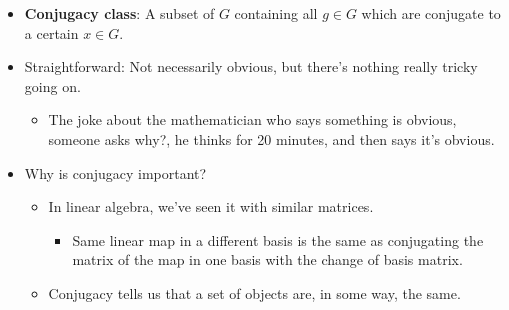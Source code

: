 \documentclass[../notes.tex]{subfiles}
\begin{document}
\begin{itemize}
\begin{enumerate}[label={(\Roman*)}]
        \begin{proof}
            Suppose $y=gxg^{-1}$ and $z=hyh^{-1}$. Then
            \begin{equation*}
                z = hgxg^{-1}h^{-1}
                = (hg)x(hg)^{-1}
            \end{equation*}
        \end{proof}
    \end{enumerate}
    \item \textbf{Conjugacy class}: A subset of $G$ containing all $g\in G$ which are conjugate to a certain $x\in G$.
    \item Straightforward: Not necessarily obvious, but there's nothing really tricky going on.
    \begin{itemize}
        \item The joke about the mathematician who says something is obvious, someone asks why?, he thinks for 20 minutes, and then says it's obvious.
    \end{itemize}
    \item Why is conjugacy important?
    \begin{itemize}
        \item In linear algebra, we've seen it with similar matrices.
        \begin{itemize}
            \item Same linear map in a different basis is the same as conjugating the matrix of the map in one basis with the change of basis matrix.
        \end{itemize}
        \item Conjugacy tells us that a set of objects are, in some way, the same.
    \end{itemize}
\end{itemize}
\end{document}
